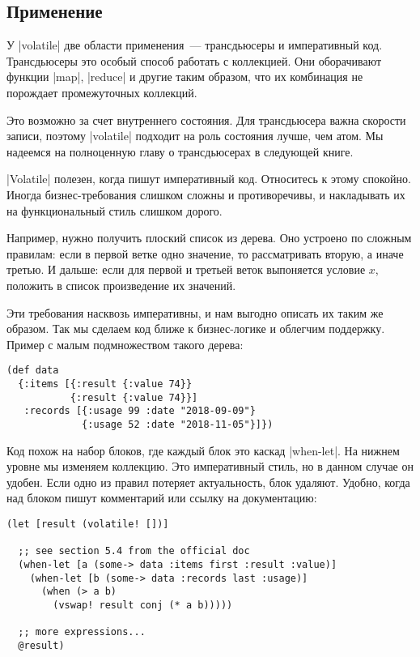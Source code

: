 \subsection{Применение}

У \spverb|volatile| две области применения~--- трансдьюсеры и императивный
код. Трансдьюсеры это особый способ работать с коллекцией. Они оборачивают
функции \spverb|map|, \spverb|reduce| и другие таким образом, что их комбинация
не порождает промежуточных коллекций.

Это возможно за счет внутреннего состояния. Для трансдьюсера важна скорости
записи, поэтому \spverb|volatile| подходит на роль состояния лучше, чем атом. Мы
надеемся на полноценную главу о трансдьюсерах в следующей книге.

\spverb|Volatile| полезен, когда пишут императивный код. Относитесь к этому
спокойно. Иногда бизнес-требования слишком сложны и противоречивы, и накладывать
их на функциональный стиль слишком дорого.

Например, нужно получить плоский список из дерева. Оно устроено по сложным
правилам: если в первой ветке одно значение, то рассматривать вторую, а иначе
третью. И дальше: если для первой и третьей веток выпоняется условие $x$,
положить в список произведение их значений.

Эти требования насквозь императивны, и нам выгодно описать их таким же
образом. Так мы сделаем код ближе к бизнес-логике и облегчим поддержку. Пример с
малым подмножеством такого дерева:

\begin{verbatim}
(def data
  {:items [{:result {:value 74}}
           {:result {:value 74}}]
   :records [{:usage 99 :date "2018-09-09"}
             {:usage 52 :date "2018-11-05"}]})
\end{verbatim}

Код похож на набор блоков, где каждый блок это каскад \spverb|when-let|. На
нижнем уровне мы изменяем коллекцию. Это императивный стиль, но в данном случае
он удобен. Если одно из правил потеряет актуальность, блок удаляют. Удобно,
когда над блоком пишут комментарий или ссылку на документацию:

\begin{verbatim}
(let [result (volatile! [])]

  ;; see section 5.4 from the official doc
  (when-let [a (some-> data :items first :result :value)]
    (when-let [b (some-> data :records last :usage)]
      (when (> a b)
        (vswap! result conj (* a b)))))

  ;; more expressions...
  @result)
\end{verbatim}

